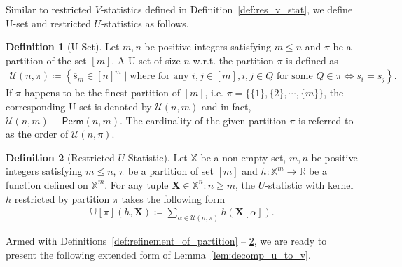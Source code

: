 \documentclass[12pt]{article}
\theoremstyle{plain}
\theoremstyle{definition}
\newtheorem{definition}{Definition}
\newcommand{\sPi}{\pi}
\newcommand{\uset}{\calU}
\newcommand{\usetnm}[2]{\uset\left(#1,#2\right)}
\newcommand{\ustat}{\mathbb{U}}
\newcommand{\perm}[1]{\mathsf{Perm}(#1)}
\newcommand{\bbR}{{\mathbb{R}}}
\def\bbX{\mathbb{X}}
\def\calU{\mathcal{U}}
\begin{document}
\begin{bibunit}[agsm]
Similar to restricted $V$-statistics defined in Definition~\ref{def:res_v_stat}, we define U-set and restricted $U$-statistics as follows. 

\begin{definition}[U-Set]\label{def:u_set}
Let $m,n$ be positive integers satisfying $m \leq n$ and $\sPi$ be a partition of the set $[m]$. A U-set of size $n$ w.r.t. the partition $\sPi$ is defined as
    \begin{align*}
        \usetnm{n}{\sPi} \coloneqq \left\{ \overline{s}_m \in [n]^m \mid \text{where for any $i, j \in [m]$}, i, j \in Q \text{ for some $Q \in \sPi$} \iff   s_i = s_j \right\}.
    \end{align*}
    If $\sPi$ happens to be the finest partition of $[m]$, i.e. $\sPi = \{\{1\}, \{2\}, \cdots, \{m\}\}$, the corresponding U-set is denoted by $\uset(n,m)$ and in fact, $\uset(n,m) \equiv \perm{n,m}$. The cardinality of the given partition $\sPi$ is referred to as the order of $\usetnm{n}{\sPi}$.
\end{definition}

\begin{definition}[Restricted $U$-Statistic]\label{def:res_u_stats}
    Let $\bbX$ be a non-empty set, $m, n$ be positive integers satisfying $m \leq n$, $\sPi$ be a partition of set $[m]$ and $h: \bbX^{m} \rightarrow \bbR$ be a function defined on $\bbX^m$. For any tuple $\bm{X} \in \bbX^n: n \geq m$, the $U$-statistic with kernel $h$ restricted by partition $\sPi$ takes the following form 
    \begin{align*}
        \ustat[\pi](h, \bm{X}) \coloneqq \sum_{\alpha \in \uset(n,\pi)} h(\bm{X}[\alpha]). 
    \end{align*}
\end{definition}

Armed with Definitions~\ref{def:refinement_of_partition} -- \ref{def:res_u_stats}, we are ready to present the following extended form of Lemma~\ref{lem:decomp_u_to_v}. 


\end{bibunit}
\end{document}
